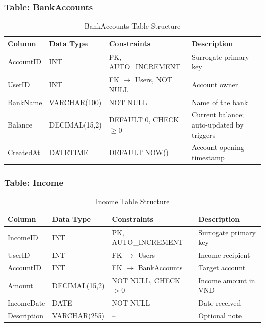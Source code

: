 \documentclass[12pt, a4paper]{article}
\begin{document}
\subsubsection{Table: BankAccounts}
\begin{table}[H]
\centering
\caption{BankAccounts Table Structure}
\begin{tabularx}{\textwidth}{lllX}
\toprule
\textbf{Column} & \textbf{Data Type} & \textbf{Constraints} & \textbf{Description} \\
\midrule
AccountID & INT           & PK, AUTO\_INCREMENT      & Surrogate primary key \\
UserID    & INT           & FK $\to$ Users, NOT NULL & Account owner \\
BankName  & VARCHAR(100)  & NOT NULL                 & Name of the bank \\
Balance   & DECIMAL(15,2) & DEFAULT 0, CHECK $\geq$0 & Current balance; auto-updated by triggers \\
CreatedAt & DATETIME      & DEFAULT NOW()            & Account opening timestamp \\
\bottomrule
\end{tabularx}
\end{table}

\subsubsection{Table: Income}
\begin{table}[H]
\centering
\caption{Income Table Structure}
\begin{tabular}{llll}
\toprule
\textbf{Column} & \textbf{Data Type} & \textbf{Constraints} & \textbf{Description} \\
\midrule
IncomeID    & INT           & PK, AUTO\_INCREMENT   & Surrogate primary key \\
UserID      & INT           & FK $\to$ Users        & Income recipient \\
AccountID   & INT           & FK $\to$ BankAccounts & Target account \\
Amount      & DECIMAL(15,2) & NOT NULL, CHECK $>0$  & Income amount in VND \\
IncomeDate  & DATE          & NOT NULL              & Date received \\
Description & VARCHAR(255)  & --                    & Optional note \\
\bottomrule
\end{tabular}
\end{table}
\end{document}
